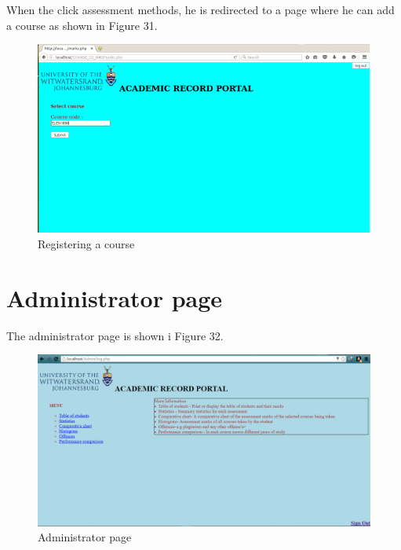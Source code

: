 \documentclass[10pt,onecolumn]{MainDocument}
\begin{document}
When the click assessment methods, he is redirected to a page where he can add a course as shown in Figure 31.


\begin{center}
\begin{figure}[h]
\centering
\includegraphics[trim = {0 0cm 0cm 0cm},clip, scale=1]{RegisteringAcourse}
\caption{Registering a course}
\end{figure}
\end{center}

\newpage

\section{Administrator page}

The administrator page is shown i Figure 32. 


\begin{center}
\begin{figure}[h]
\centering
\includegraphics[trim = {0 0cm 0cm 0cm},clip, scale=0.5]{AdminPage}
\caption{Administrator page}
\end{figure}
\end{center}
\end{document}
